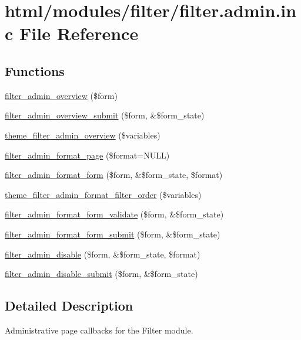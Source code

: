 \hypertarget{filter_8admin_8inc}{
\section{html/modules/filter/filter.admin.inc File Reference}
\label{filter_8admin_8inc}
}
\subsection*{Functions}
\begin{DoxyCompactItemize}
\item 
\hyperlink{group__forms_ga3fc30971380683ced638edbd19d1390c}{filter\_\-admin\_\-overview} (\$form)
\item 
\hyperlink{filter_8admin_8inc_a60b5bbf55b2f0678c64ae17f613d03d0}{filter\_\-admin\_\-overview\_\-submit} (\$form, \&\$form\_\-state)
\item 
\hyperlink{group__themeable_ga8616d9e341ab5e1466cbbf8111c172d2}{theme\_\-filter\_\-admin\_\-overview} (\$variables)
\item 
\hyperlink{filter_8admin_8inc_aad02098c7cd9b370e0692fb74f498706}{filter\_\-admin\_\-format\_\-page} (\$format=NULL)
\item 
\hyperlink{group__forms_ga8f289105b56a610a4aac171301a2371b}{filter\_\-admin\_\-format\_\-form} (\$form, \&\$form\_\-state, \$format)
\item 
\hyperlink{group__themeable_ga4abf76fee40295b66872dfa398ab1319}{theme\_\-filter\_\-admin\_\-format\_\-filter\_\-order} (\$variables)
\item 
\hyperlink{filter_8admin_8inc_a1ae5e99340abc69aadeff9d2a538d578}{filter\_\-admin\_\-format\_\-form\_\-validate} (\$form, \&\$form\_\-state)
\item 
\hyperlink{filter_8admin_8inc_a1cabbcac9ccc4de52ea16a64a8c8cd54}{filter\_\-admin\_\-format\_\-form\_\-submit} (\$form, \&\$form\_\-state)
\item 
\hyperlink{group__forms_ga425ee204872a718d5b49c40acce75b69}{filter\_\-admin\_\-disable} (\$form, \&\$form\_\-state, \$format)
\item 
\hyperlink{filter_8admin_8inc_a86acc152c70cd47fd4425333355fb36b}{filter\_\-admin\_\-disable\_\-submit} (\$form, \&\$form\_\-state)
\end{DoxyCompactItemize}


\subsection{Detailed Description}
Administrative page callbacks for the Filter module. 

